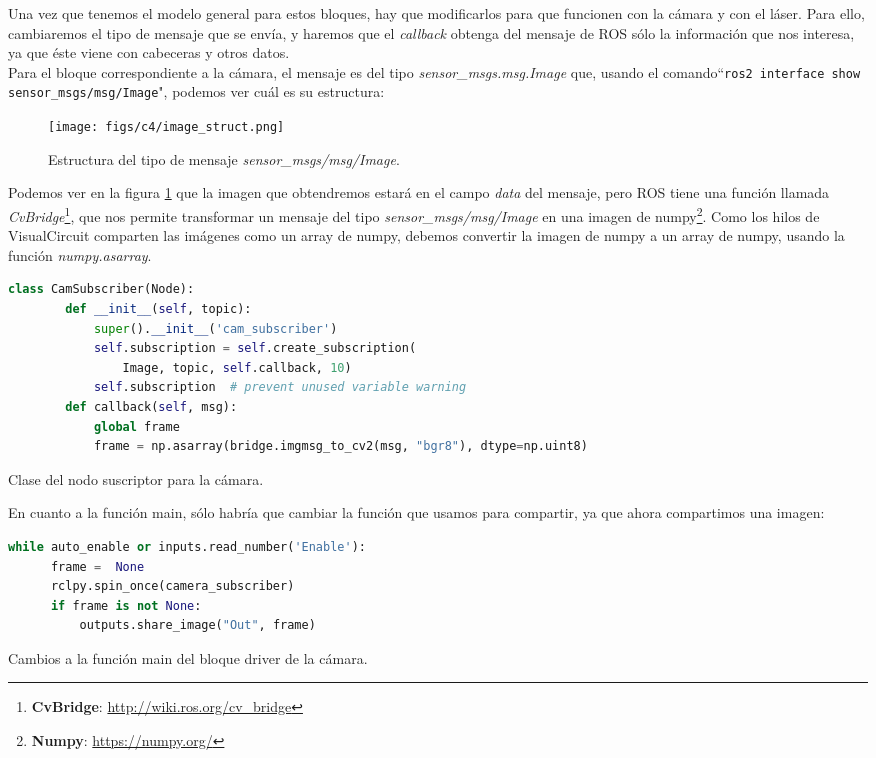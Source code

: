 Una vez que tenemos el modelo general para estos bloques, hay que modificarlos para que funcionen con la cámara y con el láser. Para ello,
cambiaremos el tipo de mensaje que se envía, y haremos que el \textit{callback} obtenga del mensaje de ROS sólo la información que nos interesa,
ya que éste viene con cabeceras y otros datos.\\

Para el bloque correspondiente a la cámara, el mensaje es del tipo \textit{sensor\_msgs.msg.Image} que, usando el comando``\lstinline|ros2 interface show sensor_msgs/msg/Image|",
podemos ver cuál es su estructura:
\begin{figure} [H]
  \begin{center}
      \texttt{[image: figs/c4/image\_struct.png]}
  \end{center}
  \caption[Estructura mensaje Image]{Estructura del tipo de mensaje \textit{sensor\_msgs/msg/Image}.}
  \label{fig:image_struct}
\end{figure}
Podemos ver en la figura \ref{fig:image_struct} que la imagen que obtendremos estará en el campo \textit{data} del mensaje, pero ROS tiene una
función llamada \textit{CvBridge}\footnote{\textbf{CvBridge}: \url{http://wiki.ros.org/cv_bridge}}, que nos permite transformar un mensaje del
tipo \textit{sensor\_msgs/msg/Image} en una imagen de numpy\footnote{\textbf{Numpy}: \url{https://numpy.org/}}. Como los hilos de VisualCircuit
comparten las imágenes como un array de numpy, debemos convertir la imagen de numpy a un array de numpy, usando la función \textit{numpy.asarray}.
\begin{code}[H]
  \begin{lstlisting}[language=python]
    class CamSubscriber(Node):
        def __init__(self, topic):
            super().__init__('cam_subscriber')
            self.subscription = self.create_subscription(
                Image, topic, self.callback, 10)
            self.subscription  # prevent unused variable warning
        def callback(self, msg):
            global frame
            frame = np.asarray(bridge.imgmsg_to_cv2(msg, "bgr8"), dtype=np.uint8)
  \end{lstlisting}
  \caption[Clase del nodo suscriptor para cámara]{Clase del nodo suscriptor para la cámara.}
  \label{cod:cam_node_class}
\end{code}
En cuanto a la función main, sólo habría que cambiar la función que usamos para compartir, ya que ahora compartimos una imagen:
\begin{code}[H]
  \begin{lstlisting}[language=python]
  while auto_enable or inputs.read_number('Enable'):
      frame =  None
      rclpy.spin_once(camera_subscriber)
      if frame is not None:
          outputs.share_image("Out", frame)
  \end{lstlisting}
  \caption[Cambios main bloque cámara]{Cambios a la función main del bloque driver de la cámara.}
  \label{cod:cam_main_changes}
\end{code}
